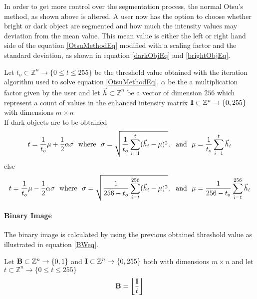 In order to get more control over the segmentation process, the normal Otsu's method, as shown above is altered. A user now has the option to choose whether bright or dark object are segmented and how much the intensity values may deviation from the mean value. This mean value is either the left or right hand side of the equation \ref{OtsuMethodEq} modified with a scaling factor and the standard deviation, as shown in equation \ref{darkObjEq} and \ref{brightObjEq}.
\begin{sBox}
	Let $ t_o \subset \mathbb{Z}^n \rightarrow \{0\leq t \leq 255\}$ be the threshold value obtained with the iteration algorithm used to solve equation \ref{OtsuMethodEq}, $ \alpha $ be the a multiplication factor given by the user and let $\vec{h} \subset \mathbb{Z}^n$ be a vector of dimension $256$ which represent a count of values in the enhanced intensity matrix $\mat{I} \subset \mathbb{Z}^n \rightarrow \{0, 255\}$ with dimensions $m \times n$\\	
	If dark objects are to be obtained
	\begin{equation}\label{darkObjEq}
		t = \frac{1}{t_o}\mu + \frac{1}{2}\alpha\sigma {\rm \ \ where\ \ }\sigma = \sqrt{\frac{1}{t_o} \sum\limits_{i=1}^t (\vec{h}_i - \mu)^2}, {\rm \ \ and\ \ } \mu = \frac{1}{t_o} \sum\limits_{i=1}^t \vec{h}_i
	\end{equation}
	 else
	 \begin{equation}\label{brightObjEq}
	 	t = \frac{1}{t_o}\mu - \frac{1}{2}\alpha\sigma {\rm \ \ where\ \ }\sigma = \sqrt{\frac{1}{256 - t_o} \sum\limits_{i=t}^{256} (\vec{h}_i - \mu)^2}, {\rm \ \ and\ \ } \mu = \frac{1}{256 - t_o} \sum\limits_{i=t}^{256} \vec{h}_i
	 \end{equation} 
\end{sBox}

\paragraph{Binary Image}\label{binaryImage} The binary image is calculated by using the previous obtained threshold value as illustrated in equation \ref{BWeq}.
\begin{sBox}
	Let $\mat{B} \subset \mathbb{Z}^n \rightarrow \{0, 1\}$ and $\mat{I} \subset \mathbb{Z}^n \rightarrow \{0, 255\}$ both with dimensions $ m \times n $ and let $t \subset \mathbb{Z}^n \rightarrow \{0\leq t \leq 255\}$
	\begin{equation}\label{BWeq}
		\mat{B} = \floor*{\frac{\mat{I}}{t}}
	\end{equation}
\end{sBox}


